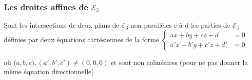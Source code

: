 \documentclass[12pt,a4paper,french]{book}
\begin{document}
			\subsubsection{Les droites affines de $\mathcal{E}_3$}
				Sont les intersections de deux plans de $\mathcal{E}_3$ non parallèles c-à-d les parties de $\mathcal{E}_3$ définies par deux équations cartésiennes de la forme $\left\lbrace \begin{array}{ll}
					 ax+by+cz+d&=0 \\a'x+b'y+c'z+d' &= 0
				\end{array}\right.$
				
				où ($a,b,c),(a',b',c') \neq (0,0,0)$ et sont non colinéaires (pour ne pas donner la même équation directionnelle)

				
\end{document}
